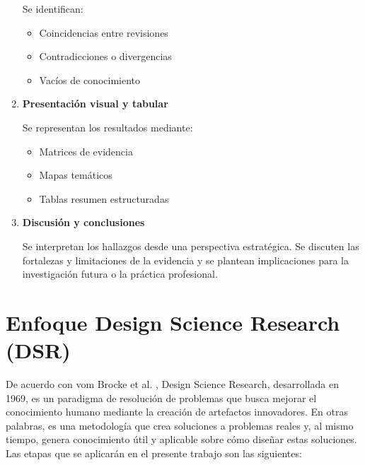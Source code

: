 \begin{enumerate}[resume]
    Se identifican:
    \begin{itemize}
        \item Coincidencias entre revisiones
        \item Contradicciones o divergencias
        \item Vacíos de conocimiento
    \end{itemize}

    \item \textbf{Presentación visual y tabular}

    Se representan los resultados mediante:
    \begin{itemize}
        \item Matrices de evidencia
        \item Mapas temáticos
        \item Tablas resumen estructuradas
    \end{itemize}

    \item \textbf{Discusión y conclusiones}

    Se interpretan los hallazgos desde una perspectiva estratégica. Se discuten las fortalezas y limitaciones de la evidencia y se plantean implicaciones para la investigación futura o la práctica profesional.
\end{enumerate}










\section{Enfoque Design Science Research (DSR)}
De acuerdo con vom Brocke et al. \cite{vomBrocke2020}, Design Science Research, desarrollada en 1969, es un paradigma de resolución de problemas que busca mejorar el conocimiento humano mediante la creación de artefactos innovadores. En otras palabras, es una metodología que crea soluciones a problemas reales y, al mismo tiempo, genera conocimiento útil y aplicable sobre cómo diseñar estas soluciones. Las etapas que se aplicarán en el presente trabajo son las siguientes:

